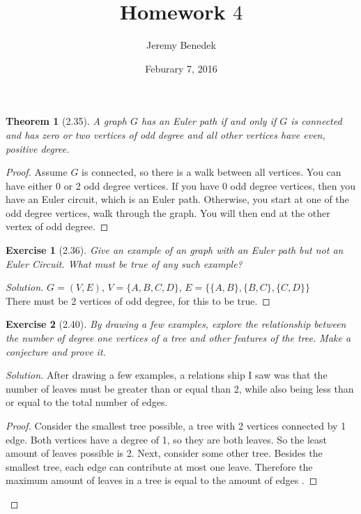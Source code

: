 \documentclass{article}
\title{Homework $4$}
\author{Jeremy Benedek}
\date{Feburary 7, 2016}
\newtheorem*{thm}{Theorem}
\newtheorem*{ex}{Exercise}
\newenvironment{solution}
  {\begin{proof}[Solution]}
  {\renewcommand{\qedsymbol}{}\end{proof}}
\begin{document}
\maketitle

\begin{thm}[2.35]
	A graph $G$ has an Euler path if and only if $G$ is connected and has zero or two vertices of odd degree and all other vertices have even,
	positive degree.
\end{thm}
\begin{proof}
	Assume $G$ is connected, so there is a walk between all vertices. You can have either 0 or 2 odd degree vertices. If you have 0 
	odd degree vertices, then you have an Euler circuit, which is an Euler path. Otherwise, you start at one of the odd degree vertices, walk
	through the graph. You will then end at the other vertex of odd degree.
\end{proof}

\begin{ex}[2.36]
	Give an example of an graph with an Euler path but not an Euler Circuit. What must be true of any such example?
\end{ex}
\begin{solution}
	$G = (V,E)$, $V=\{A,B,C,D\}$, $E=\{ \{A,B\}, \{B,C\}, \{C,D\} \}$ \\ There must be 2 vertices of odd degree, for this to be true. 
\end{solution}

\begin{ex}[2.40]
	By drawing a few examples, explore the relationship between the number of degree one vertices of a tree and other features of the tree.
	Make a conjecture and prove it.
\end{ex}
\begin{solution}
	After drawing a few examples, a relations ship I saw was that the number of leaves must be greater than or equal than 2, while
	also being less than or equal to the total number of edges. \\ 
	\begin{proof} 	Consider the smallest tree possible, a tree with 2 vertices connected by 1 edge. Both vertices have a degree of 1, so they
		are both leaves. So the least amount of leaves possible is 2. Next, consider some other tree. Besides the smallest tree,
		each edge can contribute at most one leave. Therefore the maximum amount of leaves in a tree is equal to the amount of edges
	      . \end{proof} 
\end{solution}
\end{document}
